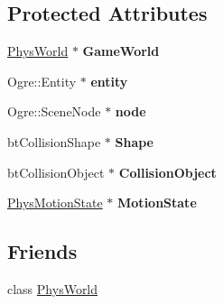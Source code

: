\subsection*{Protected Attributes}
\begin{DoxyCompactItemize}
\item 
\hypertarget{classActorBase_a02a4306818777f7c2e5853e8babd485e}{
\hyperlink{classPhysWorld}{PhysWorld} $\ast$ {\bfseries GameWorld}}
\label{dd/d7b/classActorBase_a02a4306818777f7c2e5853e8babd485e}

\item 
\hypertarget{classActorBase_ada6ceb752605b29357b6c5d53c477696}{
Ogre::Entity $\ast$ {\bfseries entity}}
\label{dd/d7b/classActorBase_ada6ceb752605b29357b6c5d53c477696}

\item 
\hypertarget{classActorBase_affa8851ae622e1d420afa4770ab89ea4}{
Ogre::SceneNode $\ast$ {\bfseries node}}
\label{dd/d7b/classActorBase_affa8851ae622e1d420afa4770ab89ea4}

\item 
\hypertarget{classActorBase_aff0d385bc9d30cf053838fd61b32ebad}{
btCollisionShape $\ast$ {\bfseries Shape}}
\label{dd/d7b/classActorBase_aff0d385bc9d30cf053838fd61b32ebad}

\item 
\hypertarget{classActorBase_ac4a1c0b5b5cd04f288f9614bfacb4fbe}{
btCollisionObject $\ast$ {\bfseries CollisionObject}}
\label{dd/d7b/classActorBase_ac4a1c0b5b5cd04f288f9614bfacb4fbe}

\item 
\hypertarget{classActorBase_a4ae7c4fd3b9449771e1c1bbd09cf103e}{
\hyperlink{classPhysMotionState}{PhysMotionState} $\ast$ {\bfseries MotionState}}
\label{dd/d7b/classActorBase_a4ae7c4fd3b9449771e1c1bbd09cf103e}

\end{DoxyCompactItemize}
\subsection*{Friends}
\begin{DoxyCompactItemize}
\item 
\hypertarget{classActorBase_a375fd37c70c941f0442997a60fdb05c7}{
class \hyperlink{classActorBase_a375fd37c70c941f0442997a60fdb05c7}{PhysWorld}}
\label{dd/d7b/classActorBase_a375fd37c70c941f0442997a60fdb05c7}

\end{DoxyCompactItemize}


